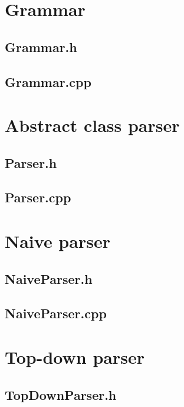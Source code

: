 
\section*{Grammar}

\subsection*{Grammar.h}


\subsection*{Grammar.cpp}


\section*{Abstract class parser}

\subsection*{Parser.h}


\subsection*{Parser.cpp}


\section*{Naive parser}

\subsection*{NaiveParser.h}


\subsection*{NaiveParser.cpp}


\section*{Top-down parser}

\subsection*{TopDownParser.h}


